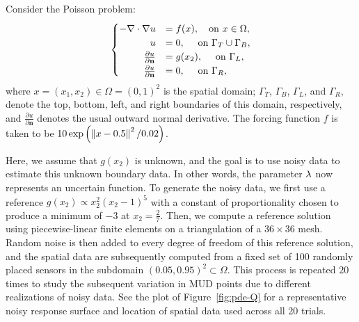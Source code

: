 Consider the Poisson problem:
\begin{equation}\label{eq:pde-equation}
\begin{cases}
\hfill -\nabla \cdot \nabla u &= f(x), \quad\text{on } x\in \Omega, \\
\hfill u &= 0, \quad\text{ on } \Gamma_T \cup \Gamma_B, \\
\hfill \frac{\partial u}{\partial \mathbf{n}} &= g(x_2), \quad\text{ on } \Gamma_L, \\
\hfill \frac{\partial u}{\partial \mathbf{n}} &= 0, \quad\text{ on } \Gamma_R,
\end{cases}
\end{equation}
where $x=(x_1, x_2) \in \Omega = (0,1)^2$ is the spatial domain; $\Gamma_T$, $\Gamma_B$, $\Gamma_L$, and $\Gamma_R$, denote the top, bottom, left, and right boundaries of this domain, respectively, and $\frac{\partial u}{\partial \mathbf{n}}$ denotes the usual outward normal derivative.
The forcing function $f$ is taken to be $10\exp\left ( \left\Vert x - 0.5\right\Vert^2 / 0.02 \right )$.

Here, we assume that $g(x_2)$ is unknown, and the goal is to use noisy data to estimate this unknown boundary data.
In other words, the parameter $\lambda$ now represents an uncertain function.
To generate the noisy data, we first use a reference $g(x_2)\propto x_2^2(x_2-1)^5$ with a constant of proportionality chosen to produce a minimum of $-3$ at $x_2=\frac{2}{7}$.
Then, we compute a reference solution using piecewise-linear finite elements on a triangulation of a $36\times36$ mesh.
Random noise is then added to every degree of freedom of this reference solution, and the spatial data are subsequently computed from a fixed set of 100 randomly placed sensors in the subdomain $(0.05, 0.95)^2 \subset \Omega$.
This process is repeated $20$ times to study the subsequent variation in MUD points due to different realizations of noisy data.
See the plot of Figure~\ref{fig:pde-Q} for a representative noisy response surface and location of spatial data used across all 20 trials.

